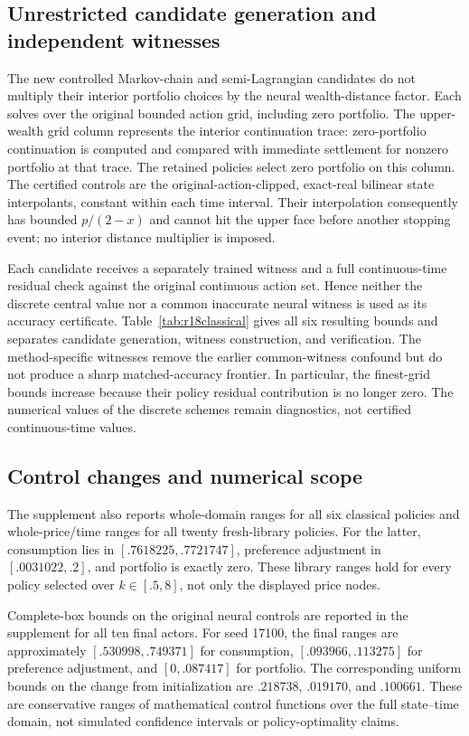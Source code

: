 \subsection{Unrestricted candidate generation and independent witnesses}
The new controlled Markov-chain and semi-Lagrangian candidates do not multiply their interior portfolio choices by the neural wealth-distance factor. Each solves over the original bounded action grid, including zero portfolio. The upper-wealth grid column represents the interior continuation trace: zero-portfolio continuation is computed and compared with immediate settlement for nonzero portfolio at that trace. The retained policies select zero portfolio on this column. The certified controls are the original-action-clipped, exact-real bilinear state interpolants, constant within each time interval. Their interpolation consequently has bounded $p/(2-x)$ and cannot hit the upper face before another stopping event; no interior distance multiplier is imposed.

Each candidate receives a separately trained witness and a full continuous-time residual check against the original continuous action set. Hence neither the discrete central value nor a common inaccurate neural witness is used as its accuracy certificate. Table~\ref{tab:r18classical} gives all six resulting bounds and separates candidate generation, witness construction, and verification. The method-specific witnesses remove the earlier common-witness confound but do not produce a sharp matched-accuracy frontier. In particular, the finest-grid bounds increase because their policy residual contribution is no longer zero. The numerical values of the discrete schemes remain diagnostics, not certified continuous-time values.


\subsection{Control changes and numerical scope}
The supplement also reports whole-domain ranges for all six classical policies and whole-price/time ranges for all twenty fresh-library policies. For the latter, consumption lies in $[.7618225,.7721747]$, preference adjustment in $[.0031022,.2]$, and portfolio is exactly zero. These library ranges hold for every policy selected over $k\in[.5,8]$, not only the displayed price nodes.

Complete-box bounds on the original neural controls are reported in the supplement for all ten final actors. For seed 17100, the final ranges are approximately $[.530998,.749371]$ for consumption, $[.093966,.113275]$ for preference adjustment, and $[0,.087417]$ for portfolio. The corresponding uniform bounds on the change from initialization are $.218738$, $.019170$, and $.100661$. These are conservative ranges of mathematical control functions over the full state--time domain, not simulated confidence intervals or policy-optimality claims.

